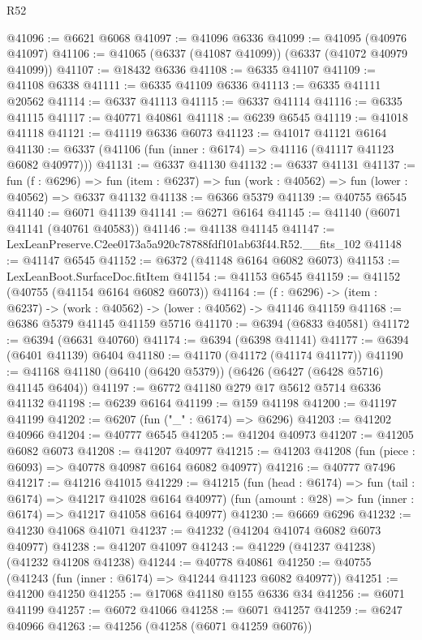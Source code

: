 \begin{lexlean}{R52}
\begin{coremodule}
@41096 := @6621 @6068
@41097 := @41096 @6336
@41099 := @41095 (@40976 @41097)
@41106 := @41065 (@6337 (@41087 @41099)) (@6337 (@41072 @40979 @41099))
@41107 := @18432 @6336
@41108 := @6335 @41107
@41109 := @41108 @6338
@41111 := @6335 @41109 @6336
@41113 := @6335 @41111 @20562
@41114 := @6337 @41113
@41115 := @6337 @41114
@41116 := @6335 @41115
@41117 := @40771 @40861
@41118 := @6239 @6545
@41119 := @41018 @41118
@41121 := @41119 @6336 @6073
@41123 := @41017 @41121 @6164
@41130 := @6337 (@41106 (fun (inner : @6174) => @41116 (@41117 @41123 @6082 @40977)))
@41131 := @6337 @41130
@41132 := @6337 @41131
@41137 := fun (f : @6296) =>
  fun (item : @6237) => fun (work : @40562) => fun (lower : @40562) => @6337 @41132
@41138 := @6366 @5379
@41139 := @40755 @6545
@41140 := @6071 @41139
@41141 := @6271 @6164
@41145 := @41140 (@6071 @41141 (@40761 @40583))
@41146 := @41138 @41145
@41147 := LexLeanPreserve.C2ee0173a5a920c78788fdf101ab63f44.R52.__fits_102
@41148 := @41147 @6545
@41152 := @6372 (@41148 @6164 @6082 @6073)
@41153 := LexLeanBoot.SurfaceDoc.fitItem
@41154 := @41153 @6545
@41159 := @41152 (@40755 (@41154 @6164 @6082 @6073))
@41164 := (f : @6296) -> (item : @6237) -> (work : @40562) -> (lower : @40562) -> @41146 @41159
@41168 := @6386 @5379 @41145 @41159 @5716
@41170 := @6394 (@6833 @40581)
@41172 := @6394 (@6631 @40760)
@41174 := @6394 (@6398 @41141)
@41177 := @6394 (@6401 @41139) @6404
@41180 := @41170 (@41172 (@41174 @41177))
@41190 := @41168 @41180 (@6410 (@6420 @5379)) (@6426 (@6427 (@6428 @5716) @41145 @6404))
@41197 := @6772 @41180 @279 @17 @5612 @5714 @6336 @41132
@41198 := @6239 @6164
@41199 := @159 @41198
@41200 := @41197 @41199
@41202 := @6207 (fun ("_" : @6174) => @6296)
@41203 := @41202 @40966
@41204 := @40777 @6545
@41205 := @41204 @40973
@41207 := @41205 @6082 @6073
@41208 := @41207 @40977
@41215 := @41203 @41208 (fun (piece : @6093) => @40778 @40987 @6164 @6082 @40977)
@41216 := @40777 @7496
@41217 := @41216 @41015
@41229 := @41215
    (fun (head : @6174) => fun (tail : @6174) => @41217 @41028 @6164 @40977)
    (fun (amount : @28) => fun (inner : @6174) => @41217 @41058 @6164 @40977)
@41230 := @6669 @6296
@41232 := @41230 @41068 @41071
@41237 := @41232 (@41204 @41074 @6082 @6073 @40977)
@41238 := @41207 @41097
@41243 := @41229 (@41237 @41238) (@41232 @41208 @41238)
@41244 := @40778 @40861
@41250 := @40755 (@41243 (fun (inner : @6174) => @41244 @41123 @6082 @40977))
@41251 := @41200 @41250
@41255 := @17068 @41180 @155 @6336 @34
@41256 := @6071 @41199
@41257 := @6072 @41066
@41258 := @6071 @41257
@41259 := @6247 @40966
@41263 := @41256 (@41258 (@6071 @41259 @6076))

\end{coremodule}
\end{lexlean}

